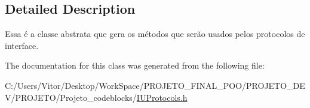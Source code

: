 \subsection{Detailed Description}
Essa é a classe abstrata que gera os métodos que serão usados pelos protocolos de interface. 

The documentation for this class was generated from the following file\-:\begin{DoxyCompactItemize}
\item 
C\-:/\-Users/\-Vitor/\-Desktop/\-Work\-Space/\-P\-R\-O\-J\-E\-T\-O\-\_\-\-F\-I\-N\-A\-L\-\_\-\-P\-O\-O/\-P\-R\-O\-J\-E\-T\-O\-\_\-\-D\-E\-V/\-P\-R\-O\-J\-E\-T\-O/\-Projeto\-\_\-codeblocks/\hyperlink{_i_u_protocols_8h}{I\-U\-Protocols.\-h}\end{DoxyCompactItemize}
